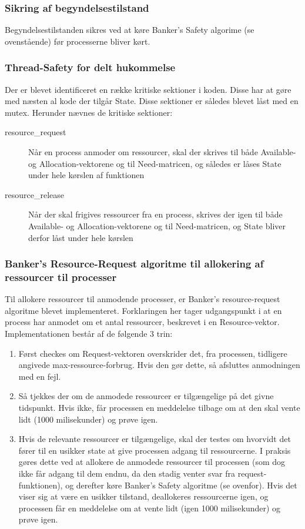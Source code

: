 \subsubsection*{Sikring af begyndelsestilstand}
Begyndelsestilstanden sikres ved at køre Banker's Safety algorime (se ovenstående) før processerne bliver kørt.

\subsubsection*{Thread-Safety for delt hukommelse}
Der er blevet identificeret en række kritiske sektioner i koden. Disse har at gøre med næsten al kode der tilgår State. Disse sektioner er således blevet låst med en mutex. Herunder nævnes de kritiske sektioner:
\begin{description}
	\item[resource\_request] Når en process anmoder om ressourcer, skal der skrives til både Available- og Allocation-vektorene og til Need-matricen, og således er låses State under hele kørslen af funktionen
	\item[resource\_release] Når der skal frigives ressourcer fra en process, skrives der igen til både Available- og Allocation-vektorene og til Need-matricen, og State bliver derfor låst under hele kørslen
\end{description}

\subsubsection*{Banker's Resource-Request algoritme til allokering af ressourcer til processer}
Til allokere ressourcer til anmodende processer, er Banker's resource-request algoritme blevet implementeret. Forklaringen her tager udgangspunkt i at en process har anmodet om et antal ressourcer, beskrevet i en Resource-vektor. Implementationen består af de følgende 3 trin:
\begin{enumerate}
	\item Først checkes om Request-vektoren overskrider det, fra processen, tidligere angivede max-ressource-forbrug. Hvis den gør dette, så afsluttes anmodningen med en fejl.
	\item Så tjekkes der om de anmodede ressourcer er tilgængelige på det givne tidspunkt. Hvis ikke, får processen en meddelelse tilbage om at den skal vente lidt (1000 milisekunder) og prøve igen.
	\item Hvis de relevante ressourcer er tilgængelige, skal der testes om hvorvidt det fører til en usikker state at give processen adgang til ressourcerne. I praksis gøres dette ved at allokere de anmodede ressourcer til processen (som dog ikke får adgang til dem endnu, da den stadig venter svar fra request-funktionen), og derefter køre Banker's Safety algoritme (se ovenfor). Hvis det viser sig at være en usikker tilstand, deallokeres ressourcerne igen, og processen får en meddelelse om at vente lidt (igen 1000 milisekunder) og prøve igen.
\end{enumerate}




